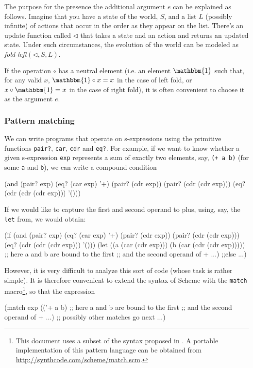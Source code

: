 The purpose for the presence the additional argument $e$ can be explained
as follows. Imagine that you have a state of the world, $S$, and a
list $L$ (possibly infinite) of actions that occur in the order as they
appear on the list. There's an update function called $\lhd$ that takes
a state and an action and returns an updated state. Under such circumstances,
the evolution of the world can be modeled as \emph{fold-left}$(\lhd, S, L)$.

If the operation $\circ$ has a neutral element (i.e. an element
$\mathbbm{1}$ such that, for any valid $x$, $\mathbbm{1} \circ x = x$ in the
case of left fold, or $x \circ \mathbbm{1} = x$ in the case of right
fold), it is often convenient to choose it as the argument $e$.

\subsubsection{Pattern matching}

We can write programs that operate on s-expressions using the
primitive functions \texttt{pair?}, \texttt{car}, \texttt{cdr}
and \texttt{eq?}. For example, if we want to know whether a given
s-expression \texttt{exp} represents a sum of exactly two elements,
say, \texttt{(+~a~b)} (for some \texttt{a} and \texttt{b}),
we can write a compound condition

\begin{Snippet}
(and (pair? exp)
     (eq? (car exp) '+)
     (pair? (cdr exp))
     (pair? (cdr (cdr exp)))
     (eq? (cdr (cdr (cdr exp))) '()))
\end{Snippet}

If we would like to capture the first and second operand to plus,
using, say, the \texttt{let} from, we would obtain:

\begin{Snippet}
(if (and (pair? exp)
         (eq? (car exp) '+)
         (pair? (cdr exp))
         (pair? (cdr (cdr exp)))
         (eq? (cdr (cdr (cdr exp))) '()))
    (let ((a (car (cdr exp)))
          (b (car (cdr (cdr exp)))))
       ;; here a and b are bound to the first
       ;; and the second operand of +
       ...)
    ;;else
    ...)
\end{Snippet}

However, it is very difficult to analyze this sort of code
(whose task is rather simple). It is therefore convenient to
extend the syntax of Scheme with the \texttt{match} macro\footnote{
  This document uses a subset of the syntax proposed in
  \cite{WrightCartwright1997}. A portable implementation
  of this pattern language can be obtained from
  \url{http://synthcode.com/scheme/match.scm}.
}, so that the expression
\begin{Snippet}
(match exp
  (('+ a b)
   ;; here a and b are bound to the first
   ;; and the second operand of +
    ...)
  ;; possibly other matches go next
  ...)
\end{Snippet}

